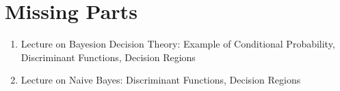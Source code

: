 \chapter{Missing Parts}

\begin{enumerate}
    \item Lecture on Bayesion Decision Theory: Example of Conditional Probability, Discriminant Functions, Decision Regions
    \item Lecture on Naive Bayes: Discriminant Functions, Decision Regions
\end{enumerate}